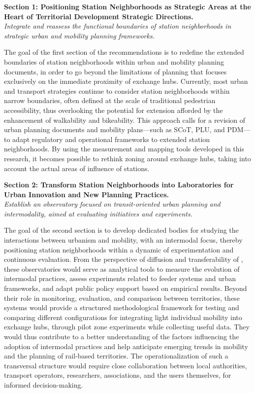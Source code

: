 \begin{refsegment}
    \begin{displayquote}
\textbf{Section 1: Positioning Station Neighborhoods as Strategic Areas at the Heart of Territorial Development Strategic Directions.}
\\
\textsl{Integrate and reassess the functional boundaries of station neighborhoods in strategic urban and mobility planning frameworks.}
    \end{displayquote}
The goal of the first section of the recommendations is to redefine the extended boundaries of station neighborhoods within urban and mobility planning documents, in order to go beyond the limitations of planning that focuses exclusively on the immediate proximity of exchange hubs. Currently, most urban and transport strategies continue to consider station neighborhoods within narrow boundaries, often defined at the scale of traditional pedestrian accessibility, thus overlooking the potential for extension afforded by the enhancement of \gls{walkability} and bikeability. This approach calls for a revision of urban planning documents and mobility plans—such as \acrfull{SCoT}, \acrfull{PLU}, and \acrfull{PDM}—to adapt regulatory and operational frameworks to extended station neighborhoods. By using the measurement and mapping tools developed in this research, it becomes possible to rethink zoning around exchange hubs, taking into account the actual areas of influence of stations.%

    \begin{displayquote}
\textbf{Section 2: Transform Station Neighborhoods into Laboratories for Urban Innovation and New Planning Practices.}
\\
\textsl{Establish an observatory focused on transit-oriented urban planning and intermodality, aimed at evaluating initiatives and experiments.}
    \end{displayquote}
The goal of the second section is to develop dedicated bodies for studying the interactions between urbanism and mobility, with an intermodal focus, thereby positioning station neighborhoods within a dynamic of experimentation and continuous evaluation. From the perspective of diffusion and transferability of , these observatories would serve as analytical tools to measure the evolution of intermodal practices, assess experiments related to feeder systems and urban frameworks, and adapt public policy support based on empirical results. Beyond their role in monitoring, evaluation, and comparison between territories, these systems would provide a structured methodological framework for testing and comparing different configurations for integrating light individual mobility into exchange hubs, through pilot zone experiments while collecting useful data. They would thus contribute to a better understanding of the factors influencing the adoption of intermodal practices and help anticipate emerging trends in mobility and the planning of rail-based territories. The operationalization of such a transversal structure would require close collaboration between local authorities, transport operators, researchers, associations, and the users themselves, for informed decision-making.%


\end{refsegment}

